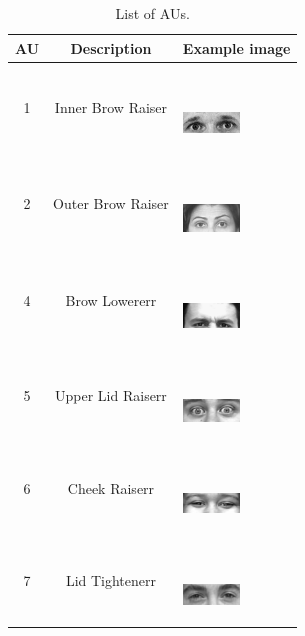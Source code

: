 \documentclass[10pt, conference, compsocconf]{IEEEtran}
\begin{document}
\begin{table}
	\caption{List of AUs.}
	\label{tab:freq}
	\centering
	\begin{tabular}{ccl}
		\toprule
		AU & Description & Example image\\ 
		\midrule
		1 & Inner Brow Raiser & \ \ \ \begin{minipage} {0.1\textwidth}   
			\includegraphics[width=0.6in]{AUimage/AU1.png}  
		\end{minipage}\\
		2 & Outer Brow Raiser & \ \ \ \begin{minipage} {0.1\textwidth}   
			\includegraphics[width=0.6in]{AUimage/AU2.png}  
		\end{minipage}\\
		4 & Brow Lowererr & \ \ \ \begin{minipage} {0.1\textwidth}   
			\includegraphics[width=0.6in]{AUimage/AU4.png}  
		\end{minipage}\\
		5 & Upper Lid Raiserr & \ \ \ \begin{minipage} {0.1\textwidth}   
			\includegraphics[width=0.6in]{AUimage/AU5.png}  
		\end{minipage}\\
		6 & Cheek Raiserr & \ \ \ \begin{minipage} {0.1\textwidth}   
			\includegraphics[width=0.6in]{AUimage/AU6.png}  
		\end{minipage}\\
		7 & Lid Tightenerr & \ \ \ \begin{minipage} {0.1\textwidth}   
			\includegraphics[width=0.6in]{AUimage/AU7.png}  
		\end{minipage}\\

\end{tabular}
\end{table}
\end{document}
